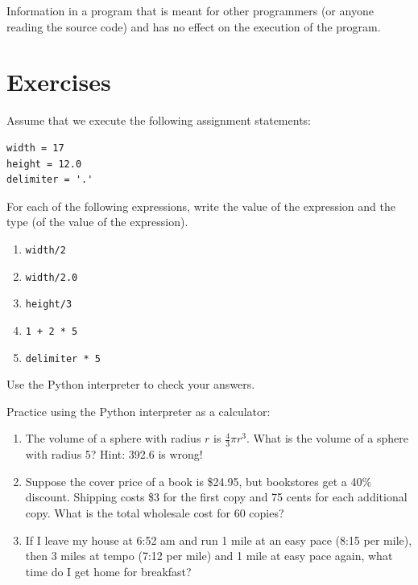 \begin{vocabulary}[comment:]  Information in a program that is meant for other
programmers (or anyone reading the source code) and has no effect on the
execution of the program.
\end{vocabulary}
	

\section{Exercises}

\begin{exercise}
Assume that we execute the following assignment statements:

\begin{verbatim}
width = 17
height = 12.0
delimiter = '.'
\end{verbatim}

For each of the following expressions, write the value of the
expression and the type (of the value of the expression).

\begin{enumerate}

\item {\tt width/2}

\item {\tt width/2.0}

\item {\tt height/3}

\item {\tt 1 + 2 * 5}

\item {\tt delimiter * 5}

\end{enumerate}

Use the Python interpreter to check your answers.
\end{exercise}

\begin{exercise}
Practice using the Python interpreter as a calculator: 

\begin{enumerate}

\item The volume of a sphere with radius $r$ is $\frac{4}{3} \pi r^3$.
  What is the volume of a sphere with radius 5?  Hint: 392.6 is wrong!

\item Suppose the cover price of a book is \$24.95, but bookstores get a
  40\% discount.  Shipping costs \$3 for the first copy and 75 cents
  for each additional copy.  What is the total wholesale cost for
  60 copies?

\item If I leave my house at 6:52 am and run 1 mile at an easy pace
  (8:15 per mile), then 3 miles at tempo (7:12 per mile) and 1 mile at
  easy pace again, what time do I get home for breakfast?


\end{enumerate}
\end{exercise}
